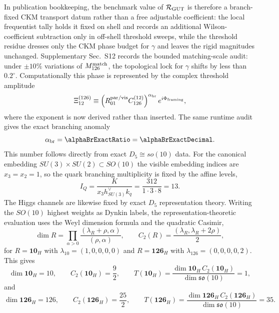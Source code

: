 \documentclass[11pt]{article}
\begin{document}
In publication bookkeeping, the benchmark value of $\mathcal R_{\rm GUT}$ is therefore a branch-fixed CKM transport datum rather than a free adjustable coefficient: the local frequentist tally holds it fixed on shell and records an additional Wilson-coefficient subtraction only in off-shell threshold sweeps, while the threshold residue dresses only the CKM phase budget for $\gamma$ and leaves the rigid magnitudes unchanged. Supplementary Sec.~S12 records the bounded matching-scale audit: under $\pm10\%$ variations of $M_{126}^{\rm match}$, the topological lock for $\gamma$ shifts by less than $0.2^\circ$.
Computationally this phase is represented by the complex threshold amplitude
\begin{equation}
 \Xi_{12}^{(126)}
 \equiv
 \left(R_{01}^{\rm par/vis}C_{126}^{(12)}\right)^{\alpha_{\rm br}}e^{i\Phi_{\rm framing}},
\end{equation}
where the exponent is now derived rather than inserted. The same runtime audit gives the exact branching anomaly
\begin{equation}
 \alpha_{\rm br}=\alphaBrExactRatio=\alphaBrExactDecimal.
\end{equation}
This number follows directly from exact $D_5\cong so(10)$ data. For the canonical embedding $SU(3)\times SU(2)\subset SO(10)$ the visible embedding indices are $x_3=x_2=1$, so the quark branching multiplicity is fixed by the affine levels,
\begin{equation}
 I_Q
 =
 \frac{K}{x_3h_{SU(3)}^{\vee}k_q}
 =
 \frac{312}{1\cdot3\cdot8}
 =13.
\end{equation}
The Higgs channels are likewise fixed by exact $D_5$ representation theory. Writing the $SO(10)$ highest weights as Dynkin labels, the representation-theoretic evaluation uses the Weyl dimension formula and the quadratic Casimir,
\begin{equation}
 \dim R
 =
 \prod_{\alpha>0}\frac{(\lambda_R+\rho,\alpha)}{(\rho,\alpha)},
 \qquad
 C_2(R)=\frac{(\lambda_R,\lambda_R+2\rho)}{2},
\end{equation}
for $R=\mathbf{10}_H$ with $\lambda_{10}=(1,0,0,0,0)$ and $R=\mathbf{126}_H$ with $\lambda_{126}=(0,0,0,0,2)$. This gives
\begin{equation}
 \dim\mathbf{10}_H=10,
 \qquad
 C_2(\mathbf{10}_H)=\frac92,
 \qquad
 T(\mathbf{10}_H)=\frac{\dim\mathbf{10}_H\,C_2(\mathbf{10}_H)}{\dim\mathfrak{so}(10)}=1,
\end{equation}
and
\begin{equation}
 \dim\mathbf{126}_H=126,
 \qquad
 C_2(\mathbf{126}_H)=\frac{25}{2},
 \qquad
 T(\mathbf{126}_H)=\frac{\dim\mathbf{126}_H\,C_2(\mathbf{126}_H)}{\dim\mathfrak{so}(10)}=35.
\end{equation}
\end{document}
